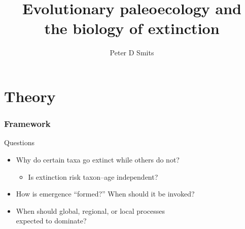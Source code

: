 \documentclass{beamer}
\title{Evolutionary paleoecology and \\the biology of extinction}
\author{Peter D Smits}
\institute{Committee on Evolutionary Biology, University of Chicago}
\begin{document}
%    

\begin{frame}
  \maketitle
\end{frame}

\begin{frame}
  \tableofcontents
\end{frame}

\section{Theory}

\begin{frame}
  \frametitle{Framework}

  \begin{alertblock}{Questions}
    \begin{itemize}
      \item Why do certain taxa go extinct while others do not?
        \begin{itemize}
          \item Is extinction risk taxon--age independent?
        \end{itemize}
      \item How is emergence ``formed?'' When should it be invoked?
      \item When should global, regional, or local processes \\expected to dominate?
    \end{itemize}
  \end{alertblock}

\end{frame}
\end{document}
